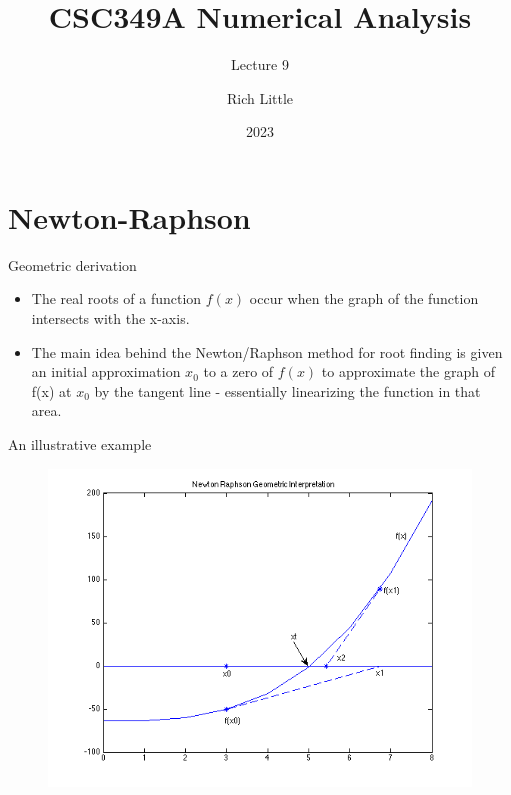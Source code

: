 \documentclass[12pt]{beamer}
\title[CSC349A Numerical Analysis]{CSC349A Numerical Analysis}
\subtitle[Lecture 9]{Lecture 9}
\date[2023]{2023}
\author[R. Little]{Rich Little}
\institute[University of Victoria]{University of Victoria}
\begin{document}
\frame{\maketitle} %








\section{Newton-Raphson} 

\begin{frame}{Geometric derivation}
\begin{itemize}
\item{The real roots of a function $f(x)$ occur when the graph of the
function intersects with the x-axis.} 
\item{The main idea behind the
Newton/Raphson method for root finding is given an initial
approximation $x_0$ to a zero of $f(x)$ to approximate the graph of f(x)
at $x_0$ by the tangent line - essentially linearizing the function in
that area.}
\end{itemize}

\end{frame}

\begin{frame}{An illustrative example} 

\begin{figure}[hbt!]
  \includegraphics[scale=0.45]{newton}
  \label{fig:newton}
\end{figure}
\end{frame}  
\end{document}
